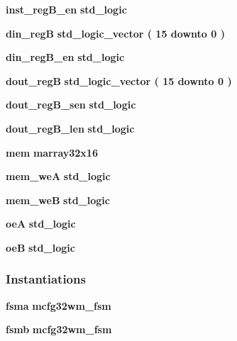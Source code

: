 \begin{DoxyCompactItemize}
\item 
{\bf inst\+\_\+reg\+B\+\_\+en} {\bfseries \textcolor{comment}{std\+\_\+logic}\textcolor{vhdlchar}{ }} 
\item 
{\bf din\+\_\+regB} {\bfseries \textcolor{comment}{std\+\_\+logic\+\_\+vector}\textcolor{vhdlchar}{ }\textcolor{vhdlchar}{(}\textcolor{vhdlchar}{ }\textcolor{vhdlchar}{ } \textcolor{vhdldigit}{15} \textcolor{vhdlchar}{ }\textcolor{keywordflow}{downto}\textcolor{vhdlchar}{ }\textcolor{vhdlchar}{ } \textcolor{vhdldigit}{0} \textcolor{vhdlchar}{ }\textcolor{vhdlchar}{)}\textcolor{vhdlchar}{ }} 
\item 
{\bf din\+\_\+reg\+B\+\_\+en} {\bfseries \textcolor{comment}{std\+\_\+logic}\textcolor{vhdlchar}{ }} 
\item 
{\bf dout\+\_\+regB} {\bfseries \textcolor{comment}{std\+\_\+logic\+\_\+vector}\textcolor{vhdlchar}{ }\textcolor{vhdlchar}{(}\textcolor{vhdlchar}{ }\textcolor{vhdlchar}{ } \textcolor{vhdldigit}{15} \textcolor{vhdlchar}{ }\textcolor{keywordflow}{downto}\textcolor{vhdlchar}{ }\textcolor{vhdlchar}{ } \textcolor{vhdldigit}{0} \textcolor{vhdlchar}{ }\textcolor{vhdlchar}{)}\textcolor{vhdlchar}{ }} 
\item 
{\bf dout\+\_\+reg\+B\+\_\+sen} {\bfseries \textcolor{comment}{std\+\_\+logic}\textcolor{vhdlchar}{ }} 
\item 
{\bf dout\+\_\+reg\+B\+\_\+len} {\bfseries \textcolor{comment}{std\+\_\+logic}\textcolor{vhdlchar}{ }} 
\item 
{\bf mem} {\bfseries {\bfseries {\bf marray32x16}} \textcolor{vhdlchar}{ }} 
\item 
{\bf mem\+\_\+weA} {\bfseries \textcolor{comment}{std\+\_\+logic}\textcolor{vhdlchar}{ }} 
\item 
{\bf mem\+\_\+weB} {\bfseries \textcolor{comment}{std\+\_\+logic}\textcolor{vhdlchar}{ }} 
\item 
{\bf oeA} {\bfseries \textcolor{comment}{std\+\_\+logic}\textcolor{vhdlchar}{ }} 
\item 
{\bf oeB} {\bfseries \textcolor{comment}{std\+\_\+logic}\textcolor{vhdlchar}{ }} 
\end{DoxyCompactItemize}
\subsubsection*{Instantiations}
 \begin{DoxyCompactItemize}
\item 
{\bf fsma}  {\bfseries mcfg32wm\+\_\+fsm}   
\item 
{\bf fsmb}  {\bfseries mcfg32wm\+\_\+fsm}   
\end{DoxyCompactItemize}


